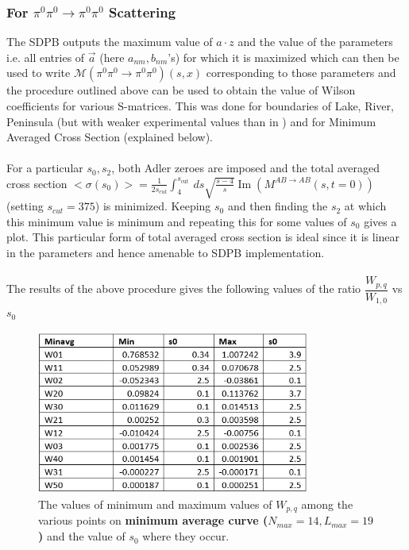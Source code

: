 ﻿\documentclass[12pt,a4paper]{article}
\begin{document}
\subsubsection{For $\pi^{0}\pi^{0}\rightarrow \pi^{0}\pi^{0}$ Scattering}
The SDPB outputs the maximum value of $a \cdot z$ and the value of the parameters i.e. all entries of $\vec{a}$ (here $a_{nm}, b_{nm}$'s) for which it is maximized which can then be used to write $\mathcal{M}(\pi^{0}\pi^{0}\rightarrow \pi^{0}\pi^{0})(s,x)$ corresponding to those parameters and the procedure outlined above can be used to obtain the value of Wilson coefficients for various S-matrices. This was done for boundaries of Lake, River, Peninsula (but with weaker experimental values than in \cite{2}) and for Minimum Averaged Cross Section (explained below).\\\\
For a particular $s_{0},s_{2}$, both Adler zeroes are imposed and the total averaged cross section $<\sigma(s_{0})>=\frac{1}{2 s_{c u t}} \int_{4}^{s_{\text {cut }}} d s \sqrt{\frac{s-4}{s}} \operatorname{Im}\left(M^{A B \rightarrow A B}(s, t=0)\right)$ (setting $s_{cut}=375$) is minimized. Keeping $s_{0}$ and then finding the $s_{2}$ at which this minimum value is minimum and repeating this for some values of $s_{0}$ gives a plot. This particular form of total averaged cross section is ideal since it is linear in the parameters and hence amenable to SDPB implementation. \\\\
The results of the above procedure gives the following values of the ratio $\dfrac{W_{p,q}}{W_{1,0}}$ vs $s_{0}$
\begin{figure}[H]
  \centering
  \includegraphics[width=9cm]{TabMinavg.jpg}
  \caption{The values of minimum and maximum values of $W_{p,q}$ among the various points on \textbf{minimum average curve ($N_{max}=14, L_{max}=19$)} and the value of $s_{0}$ where they occur.}
\end{figure}
\end{document}
